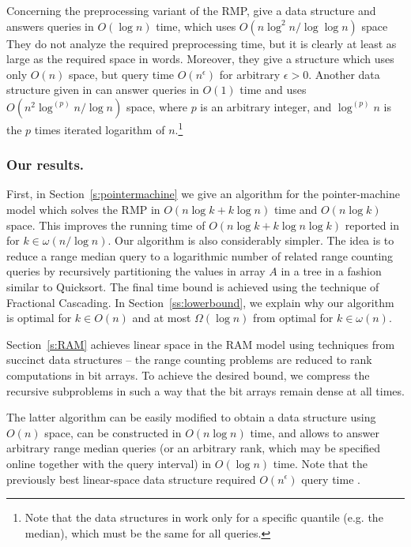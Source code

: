 \documentclass[a4paper,10pt]{article}
\begin{document}
Concerning the preprocessing variant of the RMP,
\cite{DBLP:journals/njc/KrizancMS05} give a data structure and answers queries in $O(\log n)$ time,
which uses $O(n \log^2 n /\log\log n)$ space
They do not analyze the required preprocessing time, but it is clearly at least as large as the required space in words.
Moreover, they give a structure which uses only $O(n)$ space, but query time $O(n^\epsilon)$ for arbitrary $\epsilon>0$.
 Another data structure given in \cite{DBLP:conf/sofsem/Petersen08a}
can answer queries in $O(1)$ time and uses $O(n^2 \log^{(p)} n / \log n)$ space, where $p$ is an arbitrary integer, and $\log^{(p)} n$ is the $p$ times iterated logarithm of $n$.\footnote{Note that the data structures in \cite{DBLP:journals/njc/KrizancMS05,DBLP:conf/sofsem/Petersen08a} 
work only for a specific quantile (e.g. the median), which must be the same for all queries.}


\subsubsection*{Our results.}
First, in Section~\ref{s:pointermachine} we give an algorithm for the
pointer-machine model which solves the RMP in $O(n\log k + k\log n)$
time and $O(n\log k)$ space. This improves the running time of $O(n
\log k + k\log n \log k)$ reported in
\cite{DBLP:conf/esa/Har-PeledM08} for $k \in \omega(n/\log n)$.  Our
algorithm is also considerably simpler.  The idea is to reduce a
range median query to a logarithmic number of related range counting
queries by recursively partitioning the values in array $A$ in a tree
in a fashion similar to Quicksort.  The final time bound is achieved
using the technique of Fractional Cascading.
In Section~\ref{ss:lowerbound}, we explain why our algorithm is optimal for $k\in O(n)$ and at most
$\Omega(\log n)$ from optimal for $k\in \omega(n)$.



Section~\ref{s:RAM} achieves linear space in the RAM model using
techniques from succinct data structures -- the range counting
problems are reduced to rank computations in bit arrays. To achieve
the desired bound, we compress the recursive subproblems in such a way
that the bit arrays remain dense at all times.

The latter algorithm can be easily modified to obtain a data structure using $O(n)$ space, can be constructed in $O(n \log n)$ time, and allows to answer arbitrary range median queries (or an arbitrary rank, which may be specified online together with the query interval) in $O(\log n)$ time. 
Note that the previously best linear-space data structure required $O(n^\epsilon)$ query time \cite{DBLP:journals/njc/KrizancMS05}.
\end{document}
